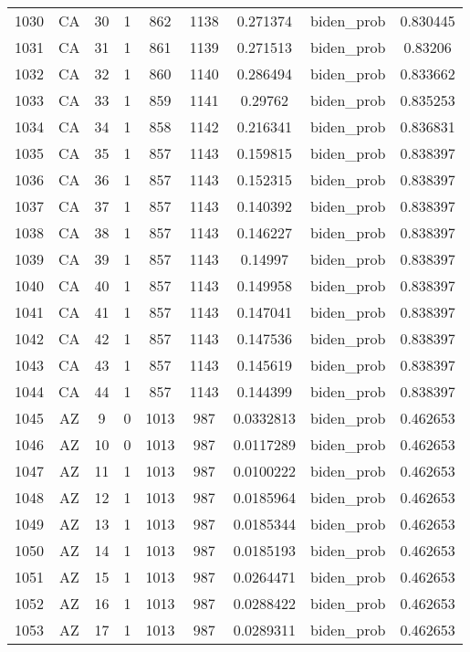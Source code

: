 \documentclass[12pt,a4paper]{article}
\begin{document}
\begin{tabular}{r|cccccccc}
	1030 & CA & 30 & 1 & 862 & 1138 & 0.271374 & biden\_prob & 0.830445 \\
	1031 & CA & 31 & 1 & 861 & 1139 & 0.271513 & biden\_prob & 0.83206 \\
	1032 & CA & 32 & 1 & 860 & 1140 & 0.286494 & biden\_prob & 0.833662 \\
	1033 & CA & 33 & 1 & 859 & 1141 & 0.29762 & biden\_prob & 0.835253 \\
	1034 & CA & 34 & 1 & 858 & 1142 & 0.216341 & biden\_prob & 0.836831 \\
	1035 & CA & 35 & 1 & 857 & 1143 & 0.159815 & biden\_prob & 0.838397 \\
	1036 & CA & 36 & 1 & 857 & 1143 & 0.152315 & biden\_prob & 0.838397 \\
	1037 & CA & 37 & 1 & 857 & 1143 & 0.140392 & biden\_prob & 0.838397 \\
	1038 & CA & 38 & 1 & 857 & 1143 & 0.146227 & biden\_prob & 0.838397 \\
	1039 & CA & 39 & 1 & 857 & 1143 & 0.14997 & biden\_prob & 0.838397 \\
	1040 & CA & 40 & 1 & 857 & 1143 & 0.149958 & biden\_prob & 0.838397 \\
	1041 & CA & 41 & 1 & 857 & 1143 & 0.147041 & biden\_prob & 0.838397 \\
	1042 & CA & 42 & 1 & 857 & 1143 & 0.147536 & biden\_prob & 0.838397 \\
	1043 & CA & 43 & 1 & 857 & 1143 & 0.145619 & biden\_prob & 0.838397 \\
	1044 & CA & 44 & 1 & 857 & 1143 & 0.144399 & biden\_prob & 0.838397 \\
	1045 & AZ & 9 & 0 & 1013 & 987 & 0.0332813 & biden\_prob & 0.462653 \\
	1046 & AZ & 10 & 0 & 1013 & 987 & 0.0117289 & biden\_prob & 0.462653 \\
	1047 & AZ & 11 & 1 & 1013 & 987 & 0.0100222 & biden\_prob & 0.462653 \\
	1048 & AZ & 12 & 1 & 1013 & 987 & 0.0185964 & biden\_prob & 0.462653 \\
	1049 & AZ & 13 & 1 & 1013 & 987 & 0.0185344 & biden\_prob & 0.462653 \\
	1050 & AZ & 14 & 1 & 1013 & 987 & 0.0185193 & biden\_prob & 0.462653 \\
	1051 & AZ & 15 & 1 & 1013 & 987 & 0.0264471 & biden\_prob & 0.462653 \\
	1052 & AZ & 16 & 1 & 1013 & 987 & 0.0288422 & biden\_prob & 0.462653 \\
	1053 & AZ & 17 & 1 & 1013 & 987 & 0.0289311 & biden\_prob & 0.462653 \\

\end{tabular}
\end{document}
